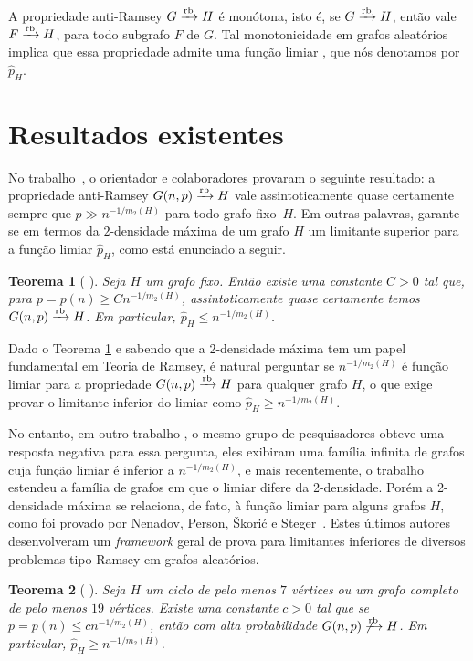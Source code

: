 \documentclass[12pt,a4paper]{book}
\def\rbarrow{\xrightarrow[]{\raisebox{0.0mm}[0mm]{$\scriptstyle \rm rb$}}}
\newtheorem{teorema}{Teorema}[chapter]
\begin{document}
A propriedade anti-Ramsey ${G\rbarrow H}$ é monótona, isto é, se ${G\rbarrow H}$, então vale ${F\rbarrow H}$, para todo subgrafo $F$ de $G$. Tal monotonicidade em 
grafos aleatórios implica que essa propriedade admite uma função limiar \cite{BoTh87}, que nós denotamos por $\hat{p}_H$. 


\section{Resultados existentes}

No trabalho~\cite{KoKoMo12}, o orientador e colaboradores provaram o seguinte resultado: a propriedade anti-Ramsey $G(n,p)\rbarrow H$ vale assintoticamente quase certamente sempre que $p\gg n^{-1/m_2(H)}$ para todo grafo fixo~$H$. Em outras palavras, garante-se em termos da $2$-densidade máxima de um grafo $H$ um limitante superior para a função limiar $\hat{p}_H$, como está enunciado a seguir.

\begin{teorema}[%
\cite{KoKoMo12}]
    \label{teo:conditional}
         Seja $H$ um grafo fixo. Então existe uma constante $C>0$ tal que, para $p=p(n)\geq Cn^{-1/m_2(H)}$, assintoticamente quase certamente temos ${G(n,p)\rbarrow H}$. 
         Em particular, $\hat{p}_H \leq n^{-1/m_2(H)}$.
  \end{teorema}
    
Dado o Teorema \ref{teo:conditional} e sabendo que a $2$-densidade máxima tem um papel fundamental em Teoria de Ramsey, é natural perguntar se $n^{-1/m_2(H)}$ é função limiar para a propriedade $G(n,p)\rbarrow H$ para qualquer grafo $H$, o que exige provar o limitante inferior do limiar como $\hat{p}_H \geq n^{-1/m_2(H)}$.

No entanto, em outro trabalho \cite{KoKoMo16+}, o mesmo grupo de pesquisadores obteve uma resposta negativa para essa pergunta, eles exibiram uma família infinita de grafos cuja função limiar é inferior a $n^{-1/m_2(H)}$, 
e mais recentemente, o trabalho \cite{araujo2022anti} estendeu a família de grafos em que o limiar difere da 2-densidade.
Porém a 2-densidade máxima se relaciona, de fato, à função limiar para alguns grafos $H$, como foi provado por Nenadov,
Person, Škorić e Steger~\cite{NePeSkSt14}.
Estes últimos autores desenvolveram um \emph{framework} geral de prova para limitantes inferiores de diversos problemas tipo Ramsey em grafos aleatórios.

\begin{teorema}[%
\cite{NePeSkSt14}]
\label{teo:nen}
  Seja $H$ um ciclo de pelo menos $7$ vértices ou um grafo completo de pelo menos $19$ vértices. 
  Existe uma constante $c > 0$ tal que se
  $p=p(n)\leq cn^{-1/m_2(H)}$, 
  então com alta probabilidade $G(n,p)\not\rbarrow  H$. 
  Em particular, $\hat{p}_H \geq n^{-1/m_2(H)}$.
\end{teorema}
\end{document}
